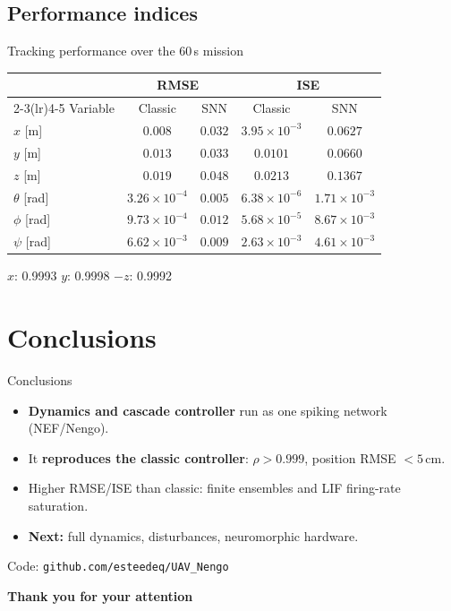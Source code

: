 \documentclass{beamer}
\begin{document}
\subsection{Performance indices}
\begin{frame}{Tracking performance over the 60\,s mission}
\begin{table}[h!]
\centering
\small
\begin{tabular}{lcccc}
\toprule
 & \multicolumn{2}{c}{RMSE} & \multicolumn{2}{c}{ISE} \\
\cmidrule(lr){2-3}\cmidrule(lr){4-5}
Variable & Classic & SNN & Classic & SNN \\
\midrule
$x$ [m]        & $0.008$ & $0.032$ & $3.95 \times 10^{-3}$ & $0.0627$ \\
$y$ [m]        & $0.013$ & $0.033$ & $0.0101$ & $0.0660$ \\
$z$ [m]        & $0.019$ & $0.048$ & $0.0213$ & $0.1367$ \\
$\theta$ [rad] & $3.26 \times 10^{-4}$ & $0.005$ & $6.38 \times 10^{-6}$ & $1.71 \times 10^{-3}$ \\
$\phi$ [rad]   & $9.73 \times 10^{-4}$ & $0.012$ & $5.68 \times 10^{-5}$ & $8.67 \times 10^{-3}$ \\
$\psi$ [rad]   & $6.62 \times 10^{-3}$ & $0.009$ & $2.63 \times 10^{-3}$ & $4.61 \times 10^{-3}$ \\
\bottomrule
\end{tabular}
\end{table}
\begin{tcolorbox}[colback = morado!10, colframe = morado!80, title = SNN vs.\ classic correlation $\rho_{\mathrm{SNN,cls}}$]
\centering
$x$: 0.9993 \qquad $y$: 0.9998 \qquad $-z$: 0.9992
\end{tcolorbox}
\end{frame}

\section[Conclusions]{Conclusions}

\begin{frame}{Conclusions}
\vspace{0.2cm}
\begin{itemize}\setlength\itemsep{10pt}
    \item[\textcolor{forestgreen}{\ding{51}}] \textbf{Dynamics and cascade controller} run as one spiking network (NEF/Nengo).
    \item[\textcolor{forestgreen}{\ding{51}}] It \textbf{reproduces the classic controller}: $\rho>0.999$, position RMSE $<5$\,cm.
    \item[\textcolor{crimsonred}{\ding{55}}] Higher RMSE/ISE than classic: finite ensembles and LIF firing-rate saturation.
    \item[\textcolor{primaryblue}{$\rightarrow$}] \textbf{Next:} full dynamics, disturbances, neuromorphic hardware.
\end{itemize}
\vfill
{\centering\scriptsize Code: \texttt{github.com/esteedeq/UAV\_Nengo}\par}
\end{frame}

\begin{frame}
    \begin{center}
    \textbf{\Huge Thank you for your attention}
    \end{center}
\end{frame}
\end{document}
